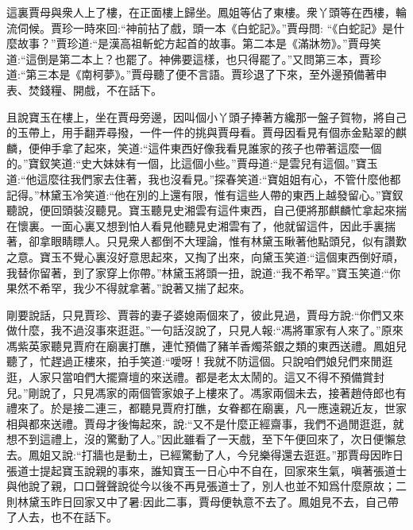 \begin{parag}
    這裏賈母與衆人上了樓，在正面樓上歸坐。鳳姐等佔了東樓。衆丫頭等在西樓，輪流伺候。賈珍一時來回:“神前拈了戲，頭一本《白蛇記》。”賈母問: “《白蛇記》是什麼故事？”賈珍道:“是漢高祖斬蛇方起首的故事。第二本是《滿牀笏》。”賈母笑道:“這倒是第二本上？也罷了。神佛要這樣，也只得罷了。”又問第三本，賈珍道:“第三本是《南柯夢》。”賈母聽了便不言語。賈珍退了下來，至外邊預備著申表、焚錢糧、開戲，不在話下。
\end{parag}


\begin{parag}
    且說寶玉在樓上，坐在賈母旁邊，因叫個小丫頭子捧著方纔那一盤子賀物，將自己的玉帶上，用手翻弄尋撥，一件一件的挑與賈母看。賈母因看見有個赤金點翠的麒麟，便伸手拿了起來，笑道:“這件東西好像我看見誰家的孩子也帶著這麼一個的。”寶釵笑道:“史大妹妹有一個，比這個小些。”賈母道:“是雲兒有這個。”寶玉道:“他這麼往我們家去住著，我也沒看見。”探春笑道:“寶姐姐有心，不管什麼他都記得。”林黛玉冷笑道:“他在別的上還有限，惟有這些人帶的東西上越發留心。”寶釵聽說，便回頭裝沒聽見。寶玉聽見史湘雲有這件東西，自己便將那麒麟忙拿起來揣在懷裏。一面心裏又想到怕人看見他聽見史湘雲有了，他就留這件，因此手裏揣著，卻拿眼睛瞟人。只見衆人都倒不大理論，惟有林黛玉瞅著他點頭兒，似有讚歎之意。寶玉不覺心裏沒好意思起來，又掏了出來，向黛玉笑道:“這個東西倒好頑，我替你留著，到了家穿上你帶。”林黛玉將頭一扭，說道:“我不希罕。”寶玉笑道:“你果然不希罕，我少不得就拿著。”說著又揣了起來。
\end{parag}


\begin{parag}
    剛要說話，只見賈珍、賈蓉的妻子婆媳兩個來了，彼此見過，賈母方說:“你們又來做什麼，我不過沒事來逛逛。”一句話沒說了，只見人報:“馮將軍家有人來了。”原來馮紫英家聽見賈府在廟裏打醮，連忙預備了豬羊香燭茶銀之類的東西送禮。鳳姐兒聽了，忙趕過正樓來，拍手笑道:“噯呀！我就不防這個。只說咱們娘兒們來閒逛逛，人家只當咱們大擺齋壇的來送禮。都是老太太鬧的。這又不得不預備賞封兒。”剛說了，只見馮家的兩個管家娘子上樓來了。馮家兩個未去，接著趙侍郎也有禮來了。於是接二連三，都聽見賈府打醮，女眷都在廟裏，凡一應遠親近友，世家相與都來送禮。賈母才後悔起來，說:“又不是什麼正經齋事，我們不過閒逛逛，就想不到這禮上，沒的驚動了人。”因此雖看了一天戲，至下午便回來了，次日便懶怠去。鳳姐又說:“打牆也是動土，已經驚動了人，今兒樂得還去逛逛。”那賈母因昨日張道士提起寶玉說親的事來，誰知寶玉一日心中不自在，回家來生氣，嗔著張道士與他說了親，口口聲聲說從今以後不再見張道士了，別人也並不知爲什麼原故；二則林黛玉昨日回家又中了暑:因此二事，賈母便執意不去了。鳳姐見不去，自己帶了人去，也不在話下。
\end{parag}


